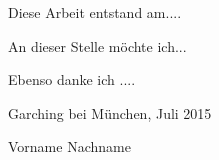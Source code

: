 \cleardoublepage
{}

Diese Arbeit entstand am....

An dieser Stelle möchte ich...

Ebenso danke ich ....

\vfill
Garching bei München, Juli 2015

Vorname Nachname